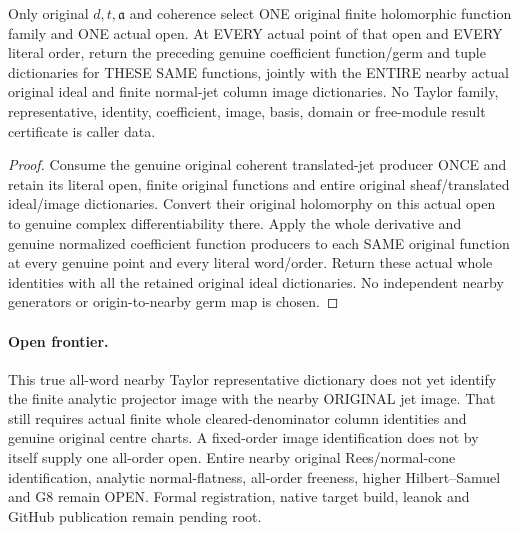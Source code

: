 \begin{theorem}
\label{hir:relative-normal-translated-taylor-original-coherent-consumer}
\leanok
{}
Only original $d,t,\mathfrak a$ and coherence select ONE original finite
holomorphic function family and ONE actual open. At EVERY actual point of
that open and EVERY literal order, return the preceding genuine coefficient
function/germ and tuple dictionaries for THESE SAME functions, jointly with
the ENTIRE nearby actual original ideal and finite normal-jet column image
dictionaries. No Taylor family, representative, identity, coefficient, image,
basis, domain or free-module result certificate is caller data.
\end{theorem}
\begin{proof}
Consume the genuine original coherent translated-jet producer ONCE and
retain its literal open, finite original functions and entire original
sheaf/translated ideal/image dictionaries. Convert their original
holomorphy on this actual open to genuine complex differentiability there.
Apply the whole derivative and genuine normalized coefficient function
producers to each SAME original function at every genuine point and every
literal word/order. Return these actual whole identities with all the
retained original ideal dictionaries. No independent nearby generators or
origin-to-nearby germ map is chosen.
\end{proof}

\paragraph{Open frontier.}
This true all-word nearby Taylor representative dictionary does not yet
identify the finite analytic projector image with the nearby ORIGINAL jet
image. That still requires actual finite whole cleared-denominator column
identities and genuine original centre charts. A fixed-order image
identification does not by itself supply one all-order open. Entire nearby
original Rees/normal-cone identification, analytic normal-flatness, all-order
freeness, higher Hilbert--Samuel and G8 remain OPEN. Formal registration,
native target build, leanok and GitHub publication remain pending root.
